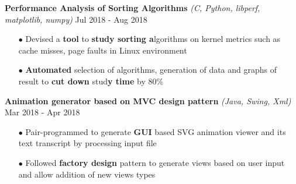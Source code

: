 \documentclass[letterpaper, 10pt, oneside]{article}
\newcommand{\bulltetspace}{\vspace{-0.3em}}
\begin{document}
\begin{center}
 \color{headings}\textbf{Performance Analysis of Sorting Algorithms} \textit{(C, Python, libperf, matplotlib, numpy)}  \hfill Jul 2018 - Aug 2018
\color{text1}
\vspace{-0.2em}
\begin{itemize}
\bulltetspace
\item[$\bullet$] Devised a \textbf{tool} to \textbf{study sorting a}lgorithms on kernel metrics such as cache misses, page faults in Linux environment\\
\bulltetspace
\item[$\bullet$] \textbf{Automated} selection of algorithms, generation of data and graphs of result to \textbf{cut down} stud\textbf{y time} by 80\% \\
\vspace{-0.2em}
\end{itemize}

\color{headings}\textbf{Animation generator based on MVC design pattern} \textit{(Java, Swing, Xml)} \hfill Mar 2018 - Apr 2018
\color{text1}
\vspace{-0.2em}
\begin{itemize}
\bulltetspace
\item[$\bullet$] Pair-programmed to generate \textbf{GUI} based SVG animation viewer and its text transcript by processing input file\\
\bulltetspace
\item[$\bullet$] Followed \textbf{factory design} pattern to generate views based on user input and allow addition of new views types
\vspace{-0.2em}
\end{itemize}




\end{center}
\end{document}

